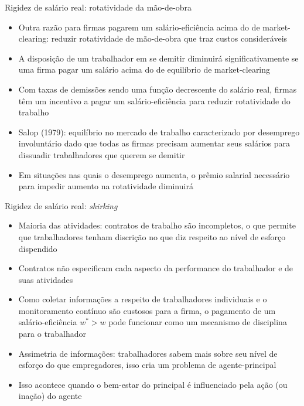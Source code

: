 \documentclass[10pt]{beamer}
\begin{document}
\begin{frame}{Rigidez de salário real: rotatividade da mão-de-obra}
    \begin{itemize}
        \item Outra razão para firmas pagarem um salário-eficiência acima do de market-clearing: reduzir rotatividade de mão-de-obra que traz custos consideráveis\bigskip
        \item A disposição de um trabalhador em se demitir diminuirá significativamente se uma firma pagar um salário acima do de equilíbrio de market-clearing\bigskip
        \item Com taxas de demissões sendo uma função decrescente do salário real, firmas têm um incentivo a pagar um salário-eficiência para reduzir rotatividade do trabalho\bigskip
        \item Salop (1979): equilíbrio no mercado de trabalho caracterizado por desemprego involuntário dado que todas as firmas precisam aumentar seus salários para dissuadir trabalhadores que querem se demitir\bigskip
        \item Em situações nas quais o desemprego aumenta, o prêmio salarial necessário para impedir aumento na rotatividade diminuirá
    \end{itemize}
\end{frame}

\begin{frame}{Rigidez de salário real: \emph{shirking}}
    \begin{itemize}
        \item Maioria das atividades: contratos de trabalho são incompletos, o que permite que trabalhadores tenham discrição no que diz respeito ao nível de esforço dispendido\bigskip
        \item Contratos não especificam cada aspecto da performance do trabalhador e de suas atividades\bigskip
        \item Como coletar informações a respeito de trabalhadores individuais e o monitoramento contínuo são custosos para a firma, o pagamento de um salário-eficiência $w^* > w$ pode funcionar como um mecanismo de disciplina para o trabalhador\bigskip
        \item Assimetria de informações: trabalhadores sabem mais sobre seu nível de esforço do que empregadores, isso cria um problema de agente-principal\bigskip
        \item Isso acontece quando o bem-estar do principal é influenciado pela ação (ou inação) do agente
    \end{itemize}
\end{frame}
\end{document}
